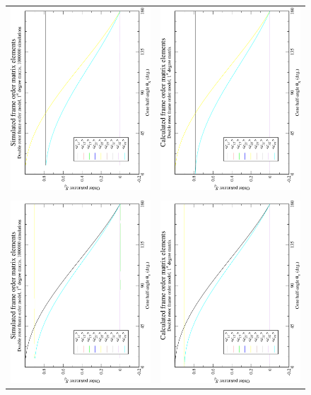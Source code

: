 \begin{figure}
\centering
  \begin{tabular}{@{}cc@{}}
    \includegraphics[width=.35\textwidth,angle=270]{images/frame_order_matrix/Sij_double_rotor_in_frame_theta_x_ens1000000.eps} &
    \includegraphics[width=.35\textwidth,angle=270]{images/frame_order_matrix/Sij_double_rotor_in_frame_theta_x_calc.eps} \\
    \\[-5pt]
    \includegraphics[width=.35\textwidth,angle=270]{images/frame_order_matrix/Sij_double_rotor_in_frame_theta_y_ens1000000.eps} &
    \includegraphics[width=.35\textwidth,angle=270]{images/frame_order_matrix/Sij_double_rotor_in_frame_theta_y_calc.eps} \\

\end{tabular}
\end{figure}
